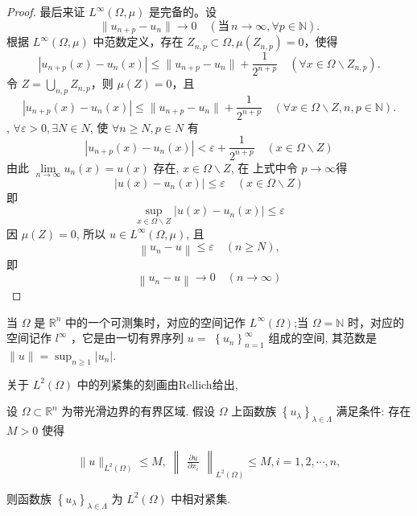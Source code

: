 \documentclass[lang=cn,newtx,10pt,scheme=chinese,thmcnt=chapter]{elegantbook}
\begin{document}
\begin{proof}
最后来证 $L^{\infty}(\Omega, \mu)$ 是完备的。设
\[
\|u_{n+p} - u_n\| \to 0 \quad (\text{当} \, n \to \infty, \forall p \in \mathbb{N}).
\]
根据 $L^{\infty}(\Omega, \mu)$ 中范数定义，存在 $Z_{n,p} \subset \Omega, \mu(Z_{n,p}) = 0$，使得
\[
|u_{n+p}(x) - u_n(x)| \leqslant \|u_{n+p} - u_n\| + \frac{1}{2^{n+p}} \quad (\forall x \in \Omega \backslash Z_{n,p}).
\]
令 $Z = \bigcup_{n,p} Z_{n,p}$，则 $\mu(Z) = 0$，且
\[
|u_{n+p}(x) - u_n(x)| \leqslant \|u_{n+p} - u_n\| + \frac{1}{2^{n+p}} \quad (\forall x \in \Omega \backslash Z, n,p \in \mathbb{N}).
\]
, $\forall \varepsilon>0, \exists N \in N$, 使 $\forall n \geqslant N, p \in N$ 有
\begin{equation*}
\left|u_{n+p}(x)-u_n(x)\right|<\varepsilon+\frac{1}{2^{n+p}} \quad(x \in \Omega \backslash Z)
\end{equation*}
由此 $\lim\limits _{n \rightarrow \infty} u_n(x)=u(x)$ 存在, $x \in \Omega \backslash Z$, 在 上式中令 $p \rightarrow \infty$得
\begin{equation*}
\left|u(x)-u_n(x)\right| \leqslant \varepsilon \quad(x \in \Omega \backslash Z)
\end{equation*}
即
\begin{equation*}
\sup _{x \in \Omega \backslash Z}\left|u(x)-u_n(x)\right| \leqslant \varepsilon
\end{equation*}
因 $\mu(Z)=0$, 所以 $u \in L^{\infty}(\Omega, \mu)$, 且
\begin{equation*}
\left\|u_n-u\right\| \leqslant \varepsilon \quad(n \geqslant N),
\end{equation*}
即
\begin{equation*}
\left\|u_n-u\right\| \rightarrow 0 \quad(n \rightarrow \infty)
\end{equation*}
\end{proof}
\begin{note}
当 $\Omega$ 是 $\mathbb{R} ^n$ 中的一个可测集时，对应的空间记作 $L^{\infty}(\Omega)$;当 $\Omega= \mathbb{N}$ 时，对应的空间记作 $l^{\infty}$ ，它是由一切有界序列 $u=$ $\left\{u_n\right\}_{n=1}^{\infty}$ 组成的空间, 其范数是 $\|u\|=\sup _{n \geqslant 1}\left|u_n\right|$.
\end{note}


关于 \({L}^{2}\left( \Omega \right)\) 中的列紧集的刻画由Rellich给出,
\begin{theorem}
   设 \(\Omega  \subset  {\mathbb{R}}^{n}\) 为带光滑边界的有界区域. 假设 \(\Omega\) 上函数族 \({\left\{  {u}_{\lambda }\right\}  }_{\lambda  \in  \Lambda }\) 满足条件: 存在 \(M > 0\) 使得

\begin{equation*}
\parallel u{\parallel }_{{L}^{2}\left( \Omega \right) } \leqslant  M,\;{\begin{Vmatrix}\frac{\partial u}{\partial {x}_{i}}\end{Vmatrix}}_{{L}^{2}\left( \Omega \right) } \leqslant  M,i = 1,2,\cdots ,n,
\end{equation*}

则函数族 \({\left\{  {u}_{\lambda }\right\}  }_{\lambda  \in  \Lambda }\) 为 \({L}^{2}\left( \Omega \right)\) 中相对紧集.
\end{theorem}
\end{document}
